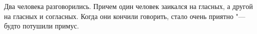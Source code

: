     Два человека разговорились. Причем один человек заикался на гласных, а
    другой на гласных и согласных. Когда они кончили говорить, стало очень
    приятно "--- будто потушили примус.